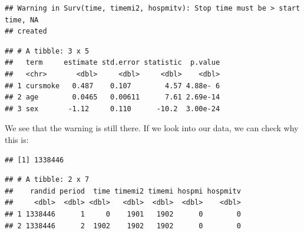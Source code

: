 \documentclass[
]{book}
\newenvironment{Shaded}{\begin{snugshade}}{\end{snugshade}}
\newcommand{\CommentTok}[1]{\textcolor[rgb]{0.56,0.35,0.01}{\textit{#1}}}
\newcommand{\KeywordTok}[1]{\textcolor[rgb]{0.13,0.29,0.53}{\textbf{#1}}}
\newcommand{\NormalTok}[1]{#1}
\newcommand{\OperatorTok}[1]{\textcolor[rgb]{0.81,0.36,0.00}{\textbf{#1}}}
\newcommand{\StringTok}[1]{\textcolor[rgb]{0.31,0.60,0.02}{#1}}
\begin{document}
\begin{verbatim}
## Warning in Surv(time, timemi2, hospmitv): Stop time must be > start time, NA
## created
\end{verbatim}

\begin{Shaded}
\end{Shaded}

\begin{verbatim}
## # A tibble: 3 x 5
##   term     estimate std.error statistic  p.value
##   <chr>       <dbl>     <dbl>     <dbl>    <dbl>
## 1 cursmoke   0.487    0.107        4.57 4.88e- 6
## 2 age        0.0465   0.00611      7.61 2.69e-14
## 3 sex       -1.12     0.110      -10.2  3.00e-24
\end{verbatim}

We see that the warning is still there. If we look into our data, we can check why this is:

\begin{Shaded}
\end{Shaded}

\begin{verbatim}
## [1] 1338446
\end{verbatim}

\begin{Shaded}
\end{Shaded}

\begin{verbatim}
## # A tibble: 2 x 7
##    randid period  time timemi2 timemi hospmi hospmitv
##     <dbl>  <dbl> <dbl>   <dbl>  <dbl>  <dbl>    <dbl>
## 1 1338446      1     0    1901   1902      0        0
## 2 1338446      2  1902    1902   1902      0        0
\end{verbatim}
\end{document}
